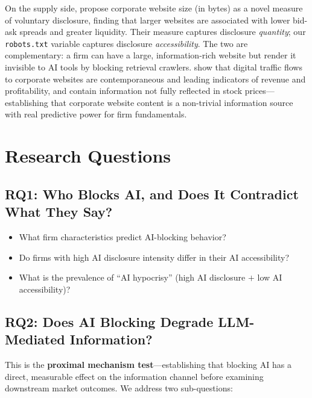 \documentclass[12pt,a4paper]{article}
\begin{document}
On the supply side, \citet{BoullandBourveauBreuer2025} propose corporate website size (in bytes) as a novel measure of voluntary disclosure, finding that larger websites are associated with lower bid-ask spreads and greater liquidity. Their measure captures disclosure \emph{quantity}; our \texttt{robots.txt} variable captures disclosure \emph{accessibility}. The two are complementary: a firm can have a large, information-rich website but render it invisible to AI tools by blocking retrieval crawlers. \citet{ArmstrongKonchitchkiZhang2025} show that digital traffic flows to corporate websites are contemporaneous and leading indicators of revenue and profitability, and contain information not fully reflected in stock prices---establishing that corporate website content is a non-trivial information source with real predictive power for firm fundamentals.

\section{Research Questions}

\subsection{RQ1: Who Blocks AI, and Does It Contradict What They Say?}
\label{sec:rq1}

\begin{itemize}
    \item What firm characteristics predict AI-blocking behavior?
    \item Do firms with high AI disclosure intensity differ in their AI accessibility?
    \item What is the prevalence of ``AI hypocrisy'' (high AI disclosure $+$ low AI accessibility)?
\end{itemize}

\subsection{RQ2: Does AI Blocking Degrade LLM-Mediated Information?}
\label{sec:rq2}

This is the \textbf{proximal mechanism test}---establishing that blocking AI has a direct, measurable effect on the information channel before examining downstream market outcomes. We address two sub-questions:
\end{document}
